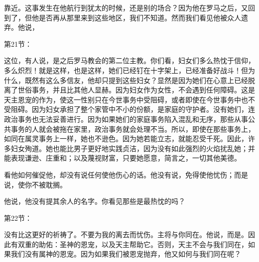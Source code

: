 靠近。这事发生在他航行到犹太的时候，还是别的场合？因为他在罗马之后，又回到了，但他是否再从那里来到这些地区，我们不知道。然而我们看见他被众人遗弃。他说，\par

第21节：\par

这位，有人说，是之后罗马教会的第二位主教。你们看，妇女们多么热忱于信仰，多么炽烈！就是这样，也是这样，她们已经钉在十字架上，已经准备好战斗！但为什么，既然有这么多信友，他却只提到这些妇女？显然是因为她们在心意上已经脱离了世俗事务，并且比其他人显赫。因为妇女作为女性，不会遇到任何障碍。这是天主恩宠的作为，使这一性别只在今世事务中受阻碍，或者即使在今世事务中也不受阻碍。因为妇女承担了整个家管中不小的份额，是家庭的守护者。没有她们，连政治事务也无法妥善进行。因为如果她们的家庭事务陷入混乱和无序，那些从事公共事务的人就会被拖在家里，政治事务就会处理不当。所以，即使在那些事务上，如同在属灵事务上一样，她也不逊色。因为她若能立志，就能忍受千死。因此，许多妇女殉道。她也能比男子更好地实践贞洁，因为没有如此强烈的火焰扰乱她；并能表现谦逊、庄重和；以及蔑视财富，只要她愿意，简言之，一切其他美德。\par

看他如何催促他，却没有说任何使他伤心的话。他没有说，免得使他忧伤；而是说，使你不被耽搁。\par

他说，他没有提其余人的名字。你看见那些是最热忱的吗？\par

第22节：\par

没有比这更好的祈祷了。不要为我的离去而忧伤。主将与你同在。他说，而是。因此有双重的助佑：圣神的恩宠，以及天主帮助它。否则，天主不会与我们同在，如果我们没有属神的恩宠。因为如果我们被恩宠抛弃，他又如何与我们同在呢？\par


